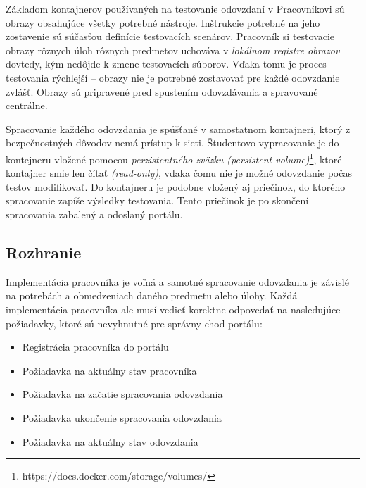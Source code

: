 \documentclass[
  digital, %
  twoside, %
  table,   %
  lof,     %
  lot,     %
]{fithesis3}
\begin{document}
Základom kontajnerov používaných na testovanie odovzdaní v Pracovníkovi sú obrazy obsahujúce všetky potrebné nástroje. Inštrukcie potrebné na jeho zostavenie sú súčasťou definície testovacích scenárov. Pracovník si testovacie obrazy rôznych úloh rôznych predmetov uchováva v \emph{lokálnom registre obrazov} dovtedy, kým nedôjde k zmene testovacích súborov. Vďaka tomu je proces testovania rýchlejší -- obrazy nie je potrebné zostavovať pre každé odovzdanie zvlášť. Obrazy sú pripravené pred spustením odovzdávania a spravované centrálne.

Spracovanie každého odovzdania je spúšťané v samostatnom kontajneri, ktorý z bezpečnostných dôvodov nemá prístup k sieti. Študentovo vypracovanie je do kontejneru vložené pomocou \emph{perzistentného zväzku (persistent volume)}\footnote{https://docs.docker.com/storage/volumes/}, ktoré kontajner smie len čítať \emph{(read-only)}, vďaka čomu nie je možné odovzdanie počas testov modifikovať. Do kontajneru je podobne vložený aj priečinok, do ktorého spracovanie zapíše výsledky testovania. Tento priečinok je po skončení spracovania zabalený a odoslaný portálu.

\subsection{Rozhranie}

Implementácia pracovníka je voľná a samotné spracovanie odovzdania je závislé na potrebách a obmedzeniach daného predmetu alebo úlohy. Každá implementácia pracovníka ale musí vedieť korektne odpovedať na nasledujúce požiadavky, ktoré sú nevyhnutné pre správny chod portálu:

\begin{itemize}
    \item Registrácia pracovníka do portálu
    \item Požiadavka na aktuálny stav pracovníka
    \item Požiadavka na začatie spracovania odovzdania
    \item Požiadavka ukončenie spracovania odovzdania
    \item Požiadavka na aktuálny stav odovzdania
\end{itemize}
\end{document}
